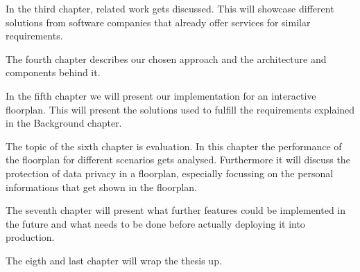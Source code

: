 In the third chapter, related work gets discussed. This will showcase different solutions from software companies that already offer services for similar requirements.

The fourth chapter describes our chosen approach and the architecture and components behind it.

In the fifth chapter we will present our implementation for an interactive floorplan. This will present the solutions used to fulfill the requirements explained in the Background chapter.

The topic of the sixth chapter is evaluation. In this chapter the performance of the floorplan for different scenarios gets analysed. Furthermore it will discuss the protection of data privacy in a floorplan, especially focussing on the personal informations that get shown in the floorplan.

The seventh chapter will present what further features could be implemented in the future and what needs to be done before actually deploying it into production. 

The eigth and last chapter will wrap the thesis up.

\clearpage